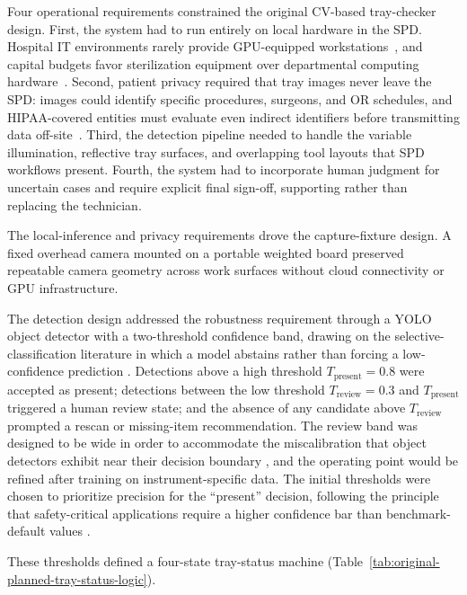 \documentclass[10pt,a4paper]{article}
\begin{document}
Four operational requirements constrained the original CV-based tray-checker
design. First, the system had to run entirely on local hardware in the SPD.
Hospital IT environments rarely provide GPU-equipped
workstations~\cite{grossi-et-al-2021, chomutare-et-al-2022}, and capital
budgets favor sterilization equipment over departmental computing
hardware~\cite{natarus-et-al-2025}. Second, patient privacy required that
tray images never leave the SPD: images could identify specific procedures,
surgeons, and OR schedules, and HIPAA-covered entities must evaluate even
indirect identifiers before transmitting data
off-site~\cite{khalid-et-al-2023}. Third, the detection pipeline needed to
handle the variable illumination, reflective tray surfaces, and overlapping
tool layouts that SPD workflows present. Fourth, the system had to
incorporate human judgment for uncertain cases and require explicit final
sign-off, supporting rather than replacing the technician.

The local-inference and privacy requirements drove the capture-fixture design.
A fixed overhead camera mounted on a portable weighted board preserved
repeatable camera geometry across work surfaces without cloud connectivity or
GPU infrastructure.

The detection design addressed the robustness requirement through a YOLO object
detector with a two-threshold confidence band, drawing on the
selective-classification literature in which a model abstains rather than
forcing a low-confidence prediction \cite{geifman-and-el-yaniv-2017}.
Detections above a high threshold \(T_{\text{present}} = 0.8\) were accepted as
present; detections between the low threshold \(T_{\text{review}} = 0.3\) and
\(T_{\text{present}}\) triggered a human review state; and the absence of any
candidate above \(T_{\text{review}}\) prompted a rescan or missing-item
recommendation. The review band was designed to be wide in order to accommodate the
miscalibration that object detectors exhibit near their decision boundary
\cite{kuppers-et-al-2022, guo-et-al-2017}, and the operating point would be refined after
training on instrument-specific data. The initial thresholds were chosen to
prioritize precision for the ``present'' decision, following the principle
that safety-critical applications require a higher confidence bar than
benchmark-default values \cite{wenkel-et-al-2021}.

These thresholds defined a four-state tray-status machine
(Table~\ref{tab:original-planned-tray-status-logic}).
\end{document}
